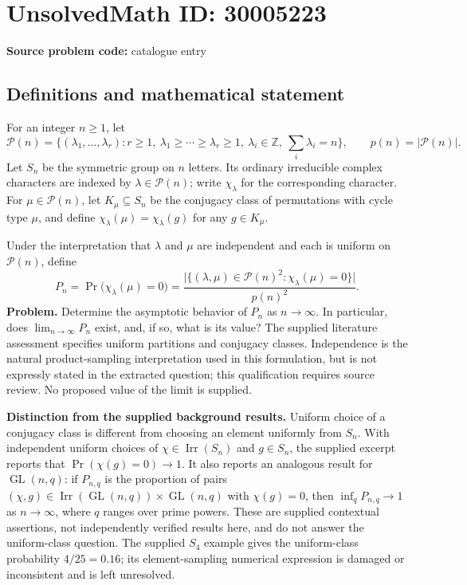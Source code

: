 \documentclass[11pt]{article}
\newcommand{\Z}{\mathbb{Z}}
\begin{document}
\section*{UnsolvedMath ID: 30005223}
\textbf{Source problem code:} catalogue entry
\subsection{Definitions and mathematical statement}
For an integer \(n\geq 1\), let
\[
\mathcal P(n)=\{(\lambda_1,\ldots,\lambda_r):r\geq 1,\ \lambda_1\geq\cdots\geq\lambda_r\geq 1,\ \lambda_i\in\Z,\ \textstyle\sum_i\lambda_i=n\},
\qquad p(n)=|\mathcal P(n)|.
\]
Let \(S_n\) be the symmetric group on \(n\) letters. Its ordinary irreducible complex characters are indexed by \(\lambda\in\mathcal P(n)\); write \(\chi_\lambda\) for the corresponding character. For \(\mu\in\mathcal P(n)\), let \(K_\mu\subseteq S_n\) be the conjugacy class of permutations with cycle type \(\mu\), and define \(\chi_\lambda(\mu)=\chi_\lambda(g)\) for any \(g\in K_\mu\).

Under the interpretation that \(\lambda\) and \(\mu\) are independent and each is uniform on \(\mathcal P(n)\), define
\[
P_n=\Pr\bigl(\chi_\lambda(\mu)=0\bigr)
=\frac{\bigl|\{(\lambda,\mu)\in\mathcal P(n)^2:\chi_\lambda(\mu)=0\}\bigr|}{p(n)^2}.
\]
\textbf{Problem.} Determine the asymptotic behavior of \(P_n\) as \(n\to\infty\). In particular, does \(\lim_{n\to\infty}P_n\) exist, and, if so, what is its value? The supplied literature assessment specifies uniform partitions and conjugacy classes. Independence is the natural product-sampling interpretation used in this formulation, but is not expressly stated in the extracted question; this qualification requires source review. No proposed value of the limit is supplied.

\textbf{Distinction from the supplied background results.} Uniform choice of a conjugacy class is different from choosing an element uniformly from \(S_n\). With independent uniform choices of \(\chi\in\operatorname{Irr}(S_n)\) and \(g\in S_n\), the supplied excerpt reports that \(\Pr(\chi(g)=0)\to 1\). It also reports an analogous result for \(\operatorname{GL}(n,q)\): if \(P_{n,q}\) is the proportion of pairs \((\chi,g)\in\operatorname{Irr}(\operatorname{GL}(n,q))\times\operatorname{GL}(n,q)\) with \(\chi(g)=0\), then \(\inf_q P_{n,q}\to 1\) as \(n\to\infty\), where \(q\) ranges over prime powers. These are supplied contextual assertions, not independently verified results here, and do not answer the uniform-class question. The supplied \(S_4\) example gives the uniform-class probability \(4/25=0.16\); its element-sampling numerical expression is damaged or inconsistent and is left unresolved.
\end{document}
